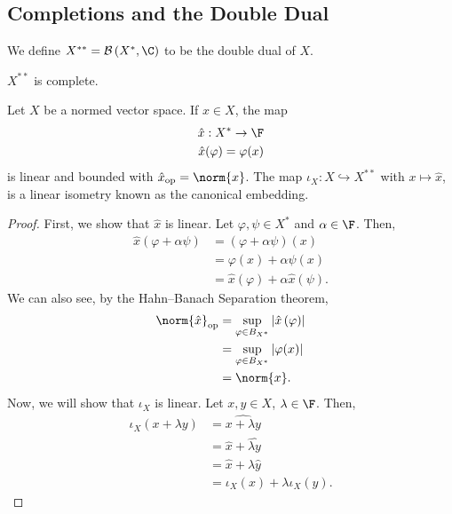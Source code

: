 \documentclass[10pt]{mypackage}
\begin{document}
\subsection{Completions and the Double Dual}%
\begin{definition}
We define $X^{\ast\ast} = \mathcal{B}\left(X^{\ast},\C\right)$ to be the double dual of $X$.
\end{definition}
\begin{remark}
$X^{\ast\ast}$ is complete.
\end{remark}
\begin{proposition}
  Let $X$ be a normed vector space. If $x\in X$, the map
  \begin{align*}
    \hat{x}: X^{\ast}\rightarrow \F\\
    \hat{x}(\varphi) = \varphi(x)
  \end{align*}
  is linear and bounded with $\hat{x}_{\text{op}} = \norm{x}$. The map $\iota_X: X\hookrightarrow X^{\ast\ast}$ with $x\mapsto \hat{x}$, is a linear isometry known as the canonical embedding.
\end{proposition}
\begin{proof}
  First, we show that $\hat{x}$ is linear. Let $\varphi,\psi\in X^{\ast}$ and $\alpha \in \F$. Then,
  \begin{align*}
    \hat{x}\left(\varphi + \alpha \psi\right) &= \left(\varphi + \alpha \psi\right)\left(x\right)\\
                                              &= \varphi(x) + \alpha\psi(x)\\
                                              &= \hat{x}\left(\varphi\right) + \alpha\hat{x}(\psi).
  \end{align*}
  We can also see, by the Hahn--Banach Separation theorem,
  \begin{align*}
    \norm{\hat{x}}_{\text{op}} &= \sup_{\varphi\in B_{X^{\ast}}}\left\vert \hat{x}\left(\varphi\right) \right\vert\\
                               &= \sup_{\varphi\in B_{X^{\ast}}} \left\vert \varphi(x) \right\vert\\
                               &= \norm{x}.
  \end{align*}
  Now, we will show that $\iota_X$ is linear. Let $x,y\in X$, $\lambda \in \F$. Then,
  \begin{align*}
    \iota_X\left(x + \lambda y\right) &= \widehat{x + \lambda y}\\
                                    &= \hat{x} + \widehat{\lambda y}\\
                                    &= \hat{x} + \lambda \hat{y}\\
                                    &= \iota_X\left(x\right) + \lambda\iota_X\left(y\right).
  \end{align*}
\end{proof}
\end{document}
